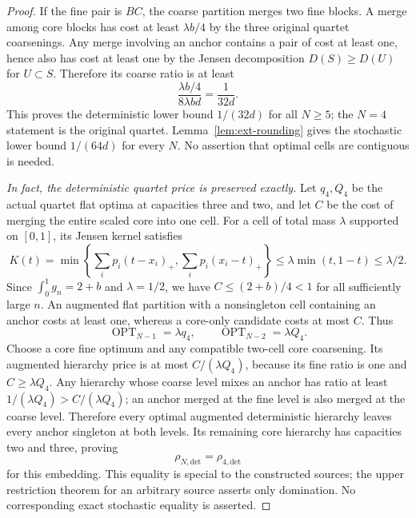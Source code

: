\begin{proof}
If the fine pair is $BC$, the coarse partition merges two fine blocks.
A merge among core blocks has cost at least $\lambda b/4$ by the
three original quartet coarsenings. Any merge involving an anchor
contains a pair of cost at least one, hence also has cost at least one
by the Jensen decomposition $D(S)\ge D(U)$ for $U\subset S$.
Therefore its coarse ratio is at least
\[
 \frac{\lambda b/4}{8\lambda bd}=\frac1{32d}.
\]
This proves the deterministic lower bound $1/(32d)$ for all $N\ge5$;
the $N=4$ statement is the original quartet. Lemma~\ref{lem:ext-rounding} gives the stochastic lower bound $1/(64d)$ for every $N$.
No assertion that optimal cells are contiguous is needed.

\par\medskip\noindent\textit{In fact, the deterministic quartet price is preserved exactly.} 
Let $q_4,Q_4$ be the actual quartet flat optima at capacities three and
two, and let $C$ be the cost of merging the entire scaled core into
one cell. For a cell of total mass $\lambda$ supported on $[0,1]$,
its Jensen kernel satisfies
\[
 K(t)=\min\!\left\{\sum_i p_i(t-x_i)_+,
                       \sum_i p_i(x_i-t)_+\right\}
 \le\lambda\min(t,1-t)\le\lambda/2.
\]
Since $\int_0^1g_n=2+b$ and $\lambda=1/2$, we have
$C\le(2+b)/4<1$ for all sufficiently large $n$.
An augmented flat partition with a nonsingleton cell containing an anchor
costs at least one,
whereas a core-only candidate costs at most $C$. Thus
\[
 \operatorname{OPT}_{N-1}=\lambda q_4,\qquad
 \operatorname{OPT}_{N-2}=\lambda Q_4.
\]
Choose a core fine optimum and any compatible two-cell core coarsening.
Its augmented hierarchy price is at most $C/(\lambda Q_4)$, because
its fine ratio is one and $C\ge\lambda Q_4$. Any hierarchy whose
coarse level mixes an anchor has ratio at least
$1/(\lambda Q_4)>C/(\lambda Q_4)$; an anchor merged at the fine level
is also merged at the coarse level. Therefore every optimal augmented
deterministic hierarchy leaves every anchor singleton at both levels.
Its remaining core hierarchy has capacities two and three, proving
\[
 \rho_{N,\mathrm{det}}=\rho_{4,\mathrm{det}}
\]
for this embedding. This equality is special to the constructed sources;
the upper restriction theorem for an arbitrary source asserts only
domination. No corresponding exact stochastic equality is asserted.


\end{proof}
